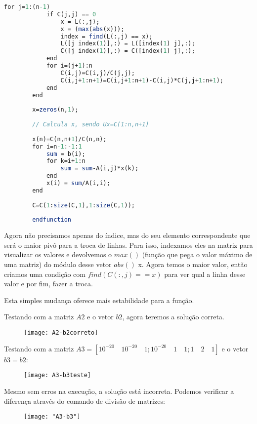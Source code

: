 \documentclass[leqno]{article}
\numberwithin{equation}{section}
\begin{document}
\begin{enumerate}
\begin{sol}
\begin{lstlisting}[language=Scilab]
		for j=1:(n-1)
			if C(j,j) == 0	
				x = L(:,j);
				x = (max(abs(x))); 
				index = find(L(:,j) == x);
				L([j index(1)],:) = L([index(1) j],:);
				C([j index(1)],:) = C([index(1) j],:);
			end
			for i=(j+1):n 
				C(i,j)=C(i,j)/C(j,j); 
				C(i,j+1:n+1)=C(i,j+1:n+1)-C(i,j)*C(j,j+1:n+1); 
			end 
		end 
		
		x=zeros(n,1); 
		
		// Calcula x, sendo Ux=C(1:n,n+1) 
		
		x(n)=C(n,n+1)/C(n,n); 
		for i=n-1:-1:1 
			sum = b(i);
			for k=i+1:n
				sum = sum-A(i,j)*x(k);
			end
			x(i) = sum/A(i,i); 
		end 
		
		C=C(1:size(C,1),1:size(C,1)); 
		
		endfunction
	\end{lstlisting}
	Agora não precisamos apenas do índice, mas do seu elemento correspondente que será o maior pivô para a troca de linhas. Para isso, indexamos eles na matriz para visualizar os valores e devolvemos o $max()$ (função que pega o valor máximo de uma matriz) do módulo desse vetor $abs()$ x. Agora temos o maior valor, então criamos uma condição com $find(C(:,j) == x)$ para ver qual a linha desse valor e por fim, fazer a troca.
	
	Esta simples mudança oferece mais estabilidade para a função.

	Testando com  a  matriz  $A2$ e o vetor $b2$, agora teremos a solução correta.
	
	\begin{figure}[H]
		\centering
		\texttt{[image: A2-b2correto]}
	\end{figure}
	
	Testando com a matriz $A3=[10^{-20} \quad 10^{-20} \quad 1; 10^{-20} \quad 1 \quad 1; 1 \quad 2 \quad 1]$ e o vetor $b3=b2$:
	
	\begin{figure}[H]
		\centering
		\texttt{[image: A3-b3teste]}
	\end{figure}

	Mesmo sem erros na execução, a solução está incorreta. Podemos verificar a diferença através do comando de divisão de matrizes:
	
	\begin{figure}[H]
		\centering
		\texttt{[image: "A3-b3"]}
	\end{figure}
	
	

\end{sol}


\end{enumerate}
\end{document}
